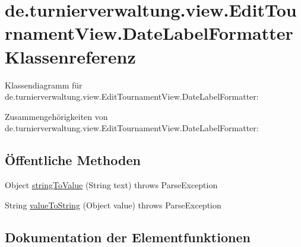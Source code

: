 \hypertarget{classde_1_1turnierverwaltung_1_1view_1_1_edit_tournament_view_1_1_date_label_formatter}{}\section{de.\+turnierverwaltung.\+view.\+Edit\+Tournament\+View.\+Date\+Label\+Formatter Klassenreferenz}
\label{classde_1_1turnierverwaltung_1_1view_1_1_edit_tournament_view_1_1_date_label_formatter}


Klassendiagramm für de.\+turnierverwaltung.\+view.\+Edit\+Tournament\+View.\+Date\+Label\+Formatter\+:


Zusammengehörigkeiten von de.\+turnierverwaltung.\+view.\+Edit\+Tournament\+View.\+Date\+Label\+Formatter\+:
\subsection*{Öffentliche Methoden}
\begin{DoxyCompactItemize}
\item 
Object \hyperlink{classde_1_1turnierverwaltung_1_1view_1_1_edit_tournament_view_1_1_date_label_formatter_ae07059dbb31d920db5feec3eca28115f}{string\+To\+Value} (String text)  throws Parse\+Exception 
\item 
String \hyperlink{classde_1_1turnierverwaltung_1_1view_1_1_edit_tournament_view_1_1_date_label_formatter_a4eb220aadc768007a461b9d102472c7b}{value\+To\+String} (Object value)  throws Parse\+Exception 
\end{DoxyCompactItemize}


\subsection{Dokumentation der Elementfunktionen}
